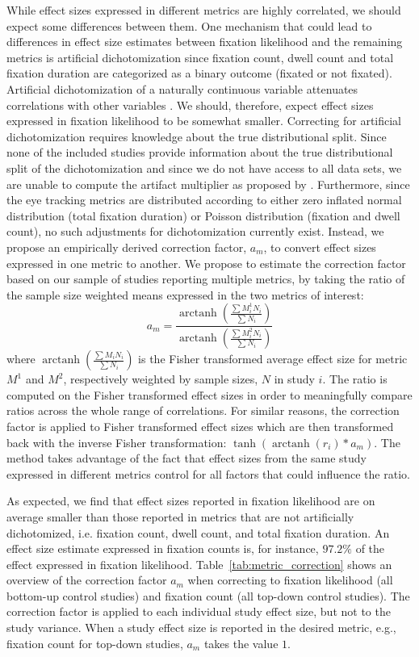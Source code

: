 \documentclass{article}
\DeclareMathOperator\arctanh{arctanh}
\begin{document}
While effect sizes expressed in different metrics are highly correlated, we should expect some differences between them. One mechanism that could lead to differences in effect size estimates between fixation likelihood and the remaining metrics is artificial dichotomization since fixation count, dwell count and total fixation duration are categorized as a binary outcome (fixated or not fixated). Artificial dichotomization of a naturally continuous variable attenuates correlations with other variables \citep{hunter2004a}. We should, therefore, expect effect sizes expressed in fixation likelihood to be somewhat smaller. Correcting for artificial dichotomization requires knowledge about the true distributional split. Since none of the included studies provide information about the true distributional split of the dichotomization and since we do not have access to all data sets, we are unable to compute the artifact multiplier as proposed by \cite{hunter2004a}. Furthermore, since the eye tracking metrics are distributed according to either zero inflated normal distribution (total fixation duration) or Poisson distribution (fixation and dwell count), no such adjustments for dichotomization currently exist. Instead, we propose an empirically derived correction factor, $a_m$, to convert effect sizes expressed in one metric to another. We propose to estimate the correction factor based on our sample of studies reporting multiple metrics, by taking the ratio of the sample size weighted means expressed in the two metrics of interest:
%
\begin{equation}
\label{eq:metrics_correction}
a_m = \frac{\arctanh \left( \frac{\sum M_i^1 N_i}{\sum N_i} \right)}{\arctanh \left( \frac{\sum M_i^2 N_i}{\sum N_i} \right)}
\end{equation}
%
where $\arctanh \left( \frac{\sum M_i N_i}{\sum N_i} \right)$ is the Fisher transformed average effect size for metric $M^1$ and $M^2$, respectively weighted by sample sizes, $N$ in study $i$. The ratio is computed on the Fisher transformed effect sizes in order to meaningfully compare ratios across the whole range of correlations. For similar reasons, the correction factor is applied to Fisher transformed effect sizes which are then transformed back with the inverse Fisher transformation: $\tanh(\arctanh(r_i)*a_m)$. The method takes advantage of the fact that effect sizes from the same study expressed in different metrics control for all factors that could influence the ratio.    

As expected, we find that effect sizes reported in fixation likelihood are on average smaller than those reported in metrics that are not artificially dichotomized, i.e. fixation count, dwell count, and total fixation duration. An effect size estimate expressed in fixation counts is, for instance, $97.2\%$ of the effect expressed in fixation likelihood. Table~\ref{tab:metric_correction} shows an overview of the correction factor $a_m$ when correcting to fixation likelihood (all bottom-up control studies) and fixation count (all top-down control studies). The correction factor is applied to each individual study effect size, but not to the study variance. When a study effect size is reported in the desired metric, e.g., fixation count for top-down studies, $a_m$ takes the value $1$.  
\end{document}

